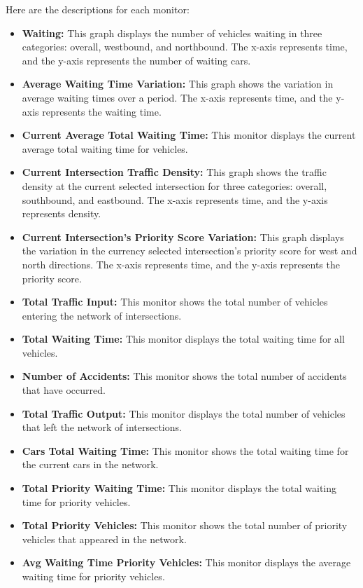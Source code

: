 \documentclass[sigconf]{acmart}
\begin{document}
Here are the descriptions for each monitor:
\begin{itemize}
    \item \textbf{Waiting:} This graph displays the number of vehicles waiting in three categories: overall, westbound, and northbound. The x-axis represents time, and the y-axis represents the number of waiting cars.
    \item \textbf{Average Waiting Time Variation:} This graph shows the variation in average waiting times over a period. The x-axis represents time, and the y-axis represents the waiting time.
    \item \textbf{Current Average Total Waiting Time:} This monitor displays the current average total waiting time for vehicles.
    \item \textbf{Current Intersection Traffic Density:} This graph shows the traffic density at the current selected intersection for three categories: overall, southbound, and eastbound. The x-axis represents time, and the y-axis represents density.
    \item \textbf{Current Intersection's Priority Score Variation:} This graph displays the variation in the currency selected intersection's priority score for west and north directions. The x-axis represents time, and the y-axis represents the priority score.
    \item \textbf{Total Traffic Input:} This monitor shows the total number of vehicles entering the network of intersections.
    \item \textbf{Total Waiting Time:} This monitor displays the total waiting time for all vehicles.
    \item \textbf{Number of Accidents:} This monitor shows the total number of accidents that have occurred.
    \item \textbf{Total Traffic Output:} This monitor displays the total number of vehicles that left the network of intersections.
    \item \textbf{Cars Total Waiting Time:} This monitor shows the total waiting time for the current cars in the network.
    \item \textbf{Total Priority Waiting Time:} This monitor displays the total waiting time for priority vehicles.
    \item \textbf{Total Priority Vehicles:} This monitor shows the total number of priority vehicles that appeared in the network.
    \item \textbf{Avg Waiting Time Priority Vehicles:} This monitor displays the average waiting time for priority vehicles.
\end{itemize}
\end{document}
